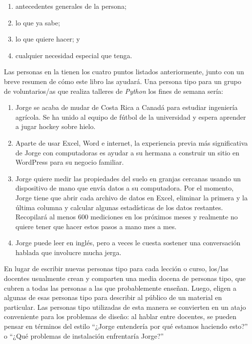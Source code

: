\begin{enumerate}
 
\item
antecedentes generales de la persona;
 
\item
lo que ya sabe;
 
\item
lo que quiere hacer;
y
 
\item
cualquier necesidad especial que tenga.
 
\end{enumerate}
 Las personas en la  tienen los cuatro puntos listados anteriormente,
junto con un breve resumen de cómo este libro las ayudará.
Una persona tipo para un grupo de voluntarios/as que realiza talleres de \emph{Python} los fines de semana sería:
 
\begin{enumerate}
 
\item
 Jorge se acaba de mudar de Costa Rica a Canadá para estudiar ingeniería agrícola.
Se ha unido al equipo de fútbol de la universidad
y espera aprender a jugar hockey sobre hielo.
 
\item
Aparte de usar Excel, Word e internet,
la experiencia previa más significativa de Jorge con computadoras
es ayudar a su hermana a construir un sitio en WordPress
para su negocio familiar.
 
 
\item
  Jorge quiere medir las propiedades del suelo en granjas cercanas
usando un dispositivo de mano que envía datos a su computadora.
Por el momento, Jorge tiene que abrir cada archivo de datos en Excel,
eliminar la primera y la última columna
y calcular algunas estadísticas de los datos restantes.
Recopilará al menos 600 mediciones en los próximos meses
y realmente no quiere tener que hacer estos pasos a mano mes a mes.
 
\item
Jorge puede leer en inglés,
pero a veces le cuesta sostener una conversación hablada que involucre mucha jerga.
 
\end{enumerate}
 
En lugar de escribir nuevas personas tipo para cada lección o curso,
los/las docentes usualmente crean y comparten una media docena de personas tipo,
que cubren a todas las personas a las que probablemente enseñan.
Luego, eligen a algunas de esas personas tipo para describir al público de un material en particular.
Las personas tipo utilizadas de esta manera se convierten en un atajo conveniente para los problemas de diseño:
al hablar entre docentes, 
se pueden pensar en términos del estilo
``¿Jorge entendería por qué estamos haciendo esto?''
o
``¿Qué problemas de instalación enfrentaría Jorge?''
 
